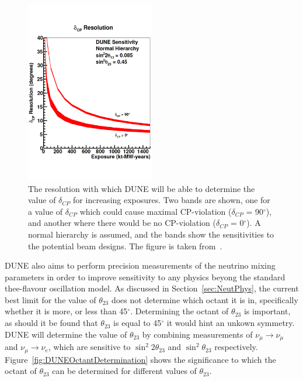 \begin{figure}[h!]
  \centering
  \includegraphics[width=0.5\textwidth]{DUNECPViolationRes}
  \caption[The resolution with which DUNE will be able to determine the value of $\delta_{CP}$ for increasing exposures]
          {The resolution with which DUNE will be able to determine the value of $\delta_{CP}$ for increasing exposures. Two bands are shown, one for a value of $\delta_{CP}$ which could cause maximal CP-violation ($\delta_{CP}$ = 90$^{\circ}$), and another where there would be no CP-violation ($\delta_{CP}$ = 0$^{\circ}$). A normal hierarchy is assumed, and the bands show the sensitivities to the potential beam designs. The figure is taken from~\citep{DUNECDR_V2}.}
  \label{fig:DUNECPViolationRes}
\end{figure}

DUNE also aims to perform precision measurements of the neutrino mixing parameters in order to improve sensitivity to any physics beyong the standard thee-flavour oscillation model. As discussed in Section~\ref{sec:NeutPhys}, the current best limit for the value of $\theta_{23}$ does not determine which octant it is in, specifically whether it is more, or less than 45$^{\circ}$. Determining the octant of $\theta_{23}$ is important, as should it be found that $\theta_{23}$ is equal to 45$^{\circ}$ it would hint an unkown symmetry. DUNE will determine the value of $\theta_{23}$ by combining measurements of $\nu_{\mu} \rightarrow \nu_{\mu}$ and $\nu_{\mu} \rightarrow \nu_{e}$, which are sensitive to $\sin^{2}2\theta_{23}$ and $\sin^2\theta_{23}$ respectively. Figure~\ref{fig:DUNEOctantDetermination} shows the significance to which the octant of $\theta_{23}$ can be determined for different values of $\theta_{23}$. \\

